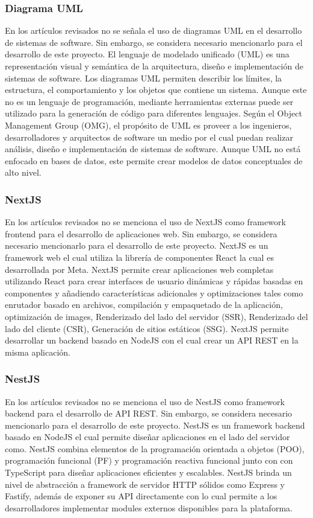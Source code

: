 \subsubsection{Diagrama UML}
En los artículos revisados no se señala el uso de diagramas UML en el desarrollo de sistemas de software. Sin embargo, se
considera necesario mencionarlo para el desarrollo de este proyecto. El lenguaje de modelado unificado (UML) es una
representación visual y semántica de la arquitectura, diseño e implementación de sistemas de software. Los diagramas
UML permiten describir los límites, la estructura, el comportamiento y los objetos que contiene un sistema. Aunque este
no es un lenguaje de programación, mediante herramientas externas puede ser utilizado para la generación de código para
diferentes lenguajes. Según el Object Management Group (OMG), el propósito de UML es proveer a los ingenieros,
desarrolladores y arquitectos de software un medio por el cual puedan realizar análisis, diseño e implementación de
sistemas de software. Aunque UML no está enfocado en bases de datos, este permite crear modelos de datos conceptuales
de alto nivel.

\subsubsection{NextJS}
En los artículos revisados no se menciona el uso de NextJS como framework frontend para el desarrollo de aplicaciones web.
Sin embargo, se considera necesario mencionarlo para el desarrollo de este proyecto. NextJS es un framework web el cual
utiliza la librería de componentes React la cual es desarrollada por Meta. NextJS permite crear aplicaciones web
completas utilizando React para crear interfaces de usuario dinámicas y rápidas basadas en componentes y añadiendo
características adicionales y optimizaciones tales como enrutador basado en archivos, compilación y empaquetado de la
aplicación, optimización de images, Renderizado del lado del servidor (SSR), Renderizado del lado del cliente (CSR),
Generación de sitios estáticos (SSG). NextJS permite desarrollar un backend basado en NodeJS con el cual crear un API
REST en la misma aplicación.

\subsubsection{NestJS}
En los artículos revisados no se menciona el uso de NestJS como framework backend para el desarrollo de API REST.
Sin embargo, se considera necesario mencionarlo para el desarrollo de este proyecto. NestJS es un framework backend
basado en NodeJS el cual permite diseñar aplicaciones en el lado del servidor como. NestJS combina elementos de la
programación orientada a objetos (POO), programación funcional (PF) y programación reactiva funcional junto con con
TypeScript para diseñar aplicaciones eficientes y escalables. NestJS brinda un nivel de abstracción a framework de
servidor HTTP sólidos como Express y Fastify, además de exponer su API directamente con lo cual permite a los
desarrolladores implementar modules externos disponibles para la plataforma.

